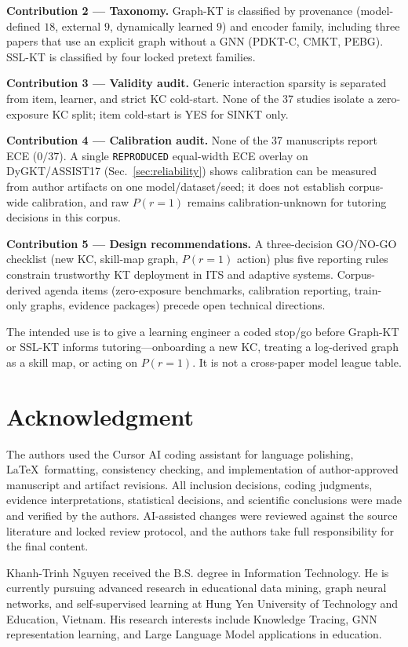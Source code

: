 \documentclass[lettersize,journal]{IEEEtran}
\begin{document}
\textbf{Contribution 2 --- Taxonomy.} Graph-KT is classified by provenance (model-defined $18$, external $9$, dynamically learned $9$) and encoder family, including three papers that use an explicit graph without a GNN (PDKT-C, CMKT, PEBG). SSL-KT is classified by four locked pretext families.

\textbf{Contribution 3 --- Validity audit.} Generic interaction sparsity is separated from item, learner, and strict KC cold-start. None of the 37 studies isolate a zero-exposure KC split; item cold-start is YES for SINKT only.

\textbf{Contribution 4 --- Calibration audit.} None of the 37 manuscripts report ECE ($0/37$). A single \texttt{REPRODUCED} equal-width ECE overlay on DyGKT/ASSIST17 (Sec.~\ref{sec:reliability}) shows calibration can be measured from author artifacts on one model/dataset/seed; it does not establish corpus-wide calibration, and raw $P(r=1)$ remains calibration-unknown for tutoring decisions in this corpus.

\textbf{Contribution 5 --- Design recommendations.} A three-decision GO/NO-GO checklist (new KC, skill-map graph, $P(r=1)$ action) plus five reporting rules constrain trustworthy KT deployment in ITS and adaptive systems. Corpus-derived agenda items (zero-exposure benchmarks, calibration reporting, train-only graphs, evidence packages) precede open technical directions.

The intended use is to give a learning engineer a coded stop/go before Graph-KT or SSL-KT informs tutoring---onboarding a new KC, treating a log-derived graph as a skill map, or acting on $P(r=1)$. It is not a cross-paper model league table.

\section*{Acknowledgment}
The authors used the Cursor AI coding assistant for language polishing, \LaTeX\ formatting, consistency checking, and implementation of author-approved manuscript and artifact revisions. All inclusion decisions, coding judgments, evidence interpretations, statistical decisions, and scientific conclusions were made and verified by the authors. AI-assisted changes were reviewed against the source literature and locked review protocol, and the authors take full responsibility for the final content.




\begin{IEEEbiographynophoto}{Khanh-Trinh Nguyen}
received the B.S. degree in Information Technology. He is currently pursuing advanced research in educational data mining, graph neural networks, and self-supervised learning at Hung Yen University of Technology and Education, Vietnam. His research interests include Knowledge Tracing, GNN representation learning, and Large Language Model applications in education.
\end{IEEEbiographynophoto}
\end{document}
